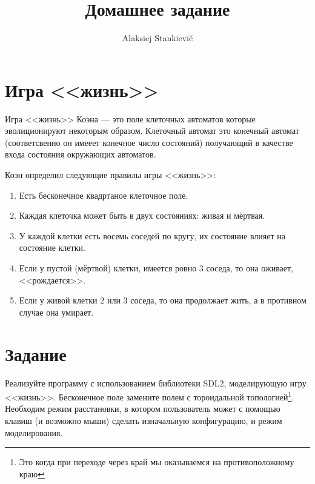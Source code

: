 \documentclass[12pt]{article}
\author{Alaksiej Stankievič}
\title{Домашнее задание}
\begin{document}

\section{Игра <<жизнь>>}
Игра <<жизнь>> Коэна --- это поле клеточных автоматов которые эволиционируют 
некоторым образом. Клеточный автомат это конечный автомат (соответсвенно он 
имееет конечное число состояний) получающий в качестве входа состояния 
окружающих автоматов.

Коэн определил следующие правилы игры <<жизнь>>:
\begin{enumerate}
 \item Есть бесконечное квадртаное клеточное поле.
 \item Каждая клеточка может быть в двух состояниях: живая и мёртвая.
 \item У каждой клетки есть восемь соседей по кругу, их состояние влияет на 
состояние клетки.
 \item Если у пустой (мёртвой) клетки, имеется ровно 3 соседа, то она оживает, 
<<рождается>>.
 \item Если у живой клетки 2 или 3 соседа, то она продолжает жить, а в 
противном случае она умирает.
\end{enumerate}


\section{Задание}

Реализуйте программу с использованием библиотеки SDL2, моделирующую игру 
<<жизнь>>. Бесконечное поле замените полем с тороидальной 
топологией\footnote{Это когда при переходе через край мы оказываемся на 
противоположному краю}. Необходим режим расстановки, в котором пользователь 
может с помощью клавиш (и возможно мыши) сделать изначальную конфигурацию, и 
режим моделирования.
\end{document}
